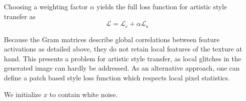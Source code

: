 Choosing a weighting factor \(\alpha\) yields the full loss function for artistic style transfer as 
\[\mathcal{L} = \mathcal{L}_\text{c}+\alpha \mathcal{L}_\text{s}\]

Because the Gram matrices describe global correlations between feature activations as detailed above, they do not retain local features of the texture at hand. This presents a problem for artistic style transfer, as local glitches in the generated image can hardly be addressed. As an alternative approach, one can define a patch based style loss function \cite{mrf2016} which respects local pixel statistics. 

We initialize \(x\) to contain white noise. 





